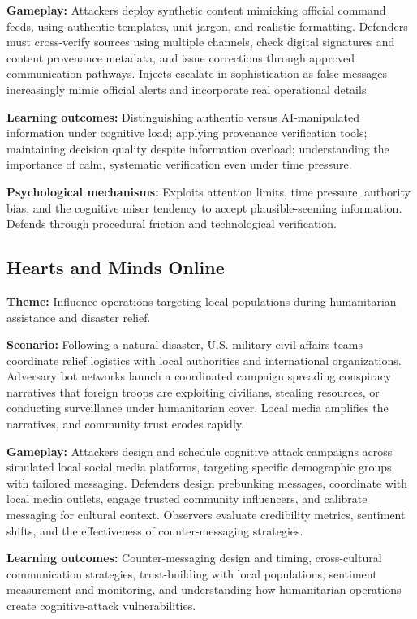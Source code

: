 \documentclass[12pt]{article}
\begin{document}
\textbf{Gameplay:} Attackers deploy synthetic content mimicking official command feeds, using authentic templates, unit jargon, and realistic formatting. Defenders must cross-verify sources using multiple channels, check digital signatures and content provenance metadata, and issue corrections through approved communication pathways. Injects escalate in sophistication as false messages increasingly mimic official alerts and incorporate real operational details.

\textbf{Learning outcomes:} Distinguishing authentic versus AI-manipulated information under cognitive load; applying provenance verification tools; maintaining decision quality despite information overload; understanding the importance of calm, systematic verification even under time pressure.

\textbf{Psychological mechanisms:} Exploits attention limits, time pressure, authority bias, and the cognitive miser tendency to accept plausible-seeming information. Defends through procedural friction and technological verification.

\subsection{Hearts and Minds Online}

\textbf{Theme:} Influence operations targeting local populations during humanitarian assistance and disaster relief.

\textbf{Scenario:} Following a natural disaster, U.S. military civil-affairs teams coordinate relief logistics with local authorities and international organizations. Adversary bot networks launch a coordinated campaign spreading conspiracy narratives that foreign troops are exploiting civilians, stealing resources, or conducting surveillance under humanitarian cover. Local media amplifies the narratives, and community trust erodes rapidly.

\textbf{Gameplay:} Attackers design and schedule cognitive attack campaigns across simulated local social media platforms, targeting specific demographic groups with tailored messaging. Defenders design prebunking messages, coordinate with local media outlets, engage trusted community influencers, and calibrate messaging for cultural context. Observers evaluate credibility metrics, sentiment shifts, and the effectiveness of counter-messaging strategies.

\textbf{Learning outcomes:} Counter-messaging design and timing, cross-cultural communication strategies, trust-building with local populations, sentiment measurement and monitoring, and understanding how humanitarian operations create cognitive-attack vulnerabilities.
\end{document}
